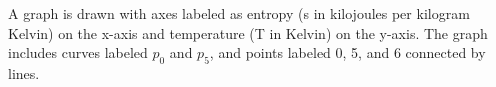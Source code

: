 A graph is drawn with axes labeled as entropy (s in kilojoules per kilogram Kelvin) on the x-axis and temperature (T in Kelvin) on the y-axis. The graph includes curves labeled \( p_0 \) and \( p_5 \), and points labeled 0, 5, and 6 connected by lines.